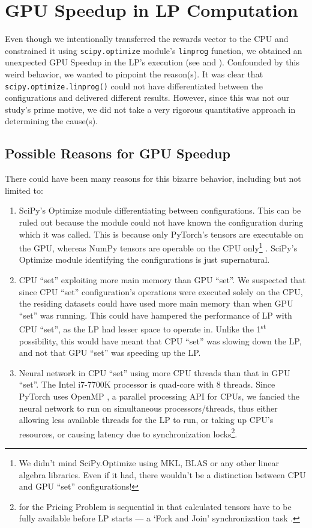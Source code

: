 \chapter{GPU Speedup in LP Computation} \label{app:GPU Speedup in LP Computation}
Even though we intentionally transferred the rewards vector to the CPU and constrained it using \texttt{scipy.optimize} module's \texttt{linprog} function, we obtained an unexpected GPU Speedup in the LP's execution (see  and ). Confounded by this weird behavior, we wanted to pinpoint the reason(s). It was clear that \texttt{scipy.optimize.linprog()} could not have differentiated between the configurations and delivered different results. However, since this was not our study's prime motive, we did not take a very rigorous quantitative approach in determining the cause(s).

\section{Possible Reasons for GPU Speedup} \label{app:Possible Reasons for GPU Speedup}
There could have been many reasons for this bizarre behavior, including but not limited to:
\begin{enumerate}
    \item SciPy's Optimize module differentiating between configurations. This can be ruled out because the module could not have known the configuration during which it was called. This is because only PyTorch's tensors are executable on the GPU, whereas NumPy tensors are operable on the CPU only\footnote{We didn't mind SciPy.Optimize using MKL, BLAS or any other linear algebra libraries. Even if it had, there wouldn't be a distinction between CPU and GPU ``set'' configurations!} \cite{PTDocs,NPDocs,SCPOptimizeDocs}. SciPy's Optimize module identifying the configurations is just supernatural.
    \item CPU ``set'' exploiting more main memory than GPU ``set''. We suspected that since CPU ``set'' configuration's operations were executed solely on the CPU, the residing datasets could have used more main memory than when GPU ``set'' was running. This could have hampered the performance of LP with CPU ``set'', as the LP had lesser space to operate in. Unlike the 1\textsuperscript{st} possibility, this would have meant that CPU ``set'' was slowing down the LP, and not that GPU ``set'' was speeding up the LP.
    \item Neural network in CPU ``set'' using more CPU threads than that in GPU ``set''. The Intel i7-7700K processor is quad-core with 8 threads. Since PyTorch uses OpenMP \cite{PTDocs,OpenMP}, a parallel processing API for CPUs, we fancied the neural network to run on simultaneous processors/threads, thus either allowing less available threads for the LP to run, or taking up CPU's resources, or causing latency due to synchronization locks\footnote{ for the Pricing Problem is sequential in that calculated tensors have to be fully available before LP starts --- a `Fork and Join' synchronization task \cite[Section~2.2]{IssuesMP}.}.
\end{enumerate}

